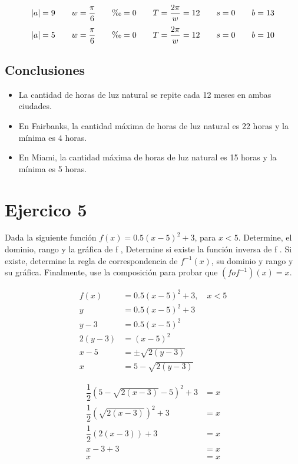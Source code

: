 \documentclass[12pt]{article}
\begin{document}
\[
\begin{array}{c c c c c c}
  \left|a\right| = 9 \quad & w = \dfrac{\pi}{6} \quad & \O = 0 \quad & T = \dfrac{2\pi}{w} = 12 \quad & s = 0 \quad & b = 13
\end{array}
\]
\[
\begin{array}{c c c c c c}
  \left|a\right| = 5 \quad & w = \dfrac{\pi}{6} \quad & \O = 0 \quad & T = \dfrac{2\pi}{w} = 12 \quad & s = 0 \quad & b = 10
\end{array}
\]

\subsection*{Conclusiones}
\begin{itemize}
  \item La cantidad de horas de luz natural se repite cada 12 meses en ambas ciudades.
  \item En Fairbanks, la cantidad máxima de horas de luz natural es 22 horas y la mínima es 4 horas.
  \item En Miami, la cantidad máxima de horas de luz natural es 15 horas y la mínima es 5 horas.
\end{itemize}


\newpage
\section*{Ejercico 5}
\noindent Dada la siguiente función $f(x) = 0.5(x-5)^2+3$, para $x < 5$. Determine, el dominio, rango y la gráfica de f , Determine si existe la función inversa de f . Si existe, determine la regla de correspondencia de $f^{-1}(x)$, su dominio y rango y su gráfica. Finalmente, use la composición para probar que $\left(f o f^{-1}\right)(x) = x$.
\begin{center}
\begin{minipage}{0.48\textwidth}
\[
\begin{aligned}
  f(x) &= 0.5(x-5)^2 + 3, \quad x < 5 \\
  y &= 0.5(x-5)^2 + 3 \\
  y - 3 &= 0.5(x-5)^2 \\
  2(y - 3) &= (x-5)^2 \\
  x - 5 &= \pm \sqrt{2(y - 3)} \\
  x &= 5 - \sqrt{2(y - 3)}
\end{aligned}
\]
\end{minipage}
\hfill
\begin{minipage}{0.48\textwidth}
\[
\begin{aligned}
  \dfrac{1}{2}(5-\sqrt{2(x - 3)}-5)^2 + 3 &= x \\
  \dfrac{1}{2}(\sqrt{2(x - 3)})^2 + 3 &= x \\
  \dfrac{1}{2}(2(x - 3)) + 3 &= x \\
  x - 3 + 3 &= x \\
  x &= x
\end{aligned}
\]
\end{minipage}
\end{center}
\end{document}
